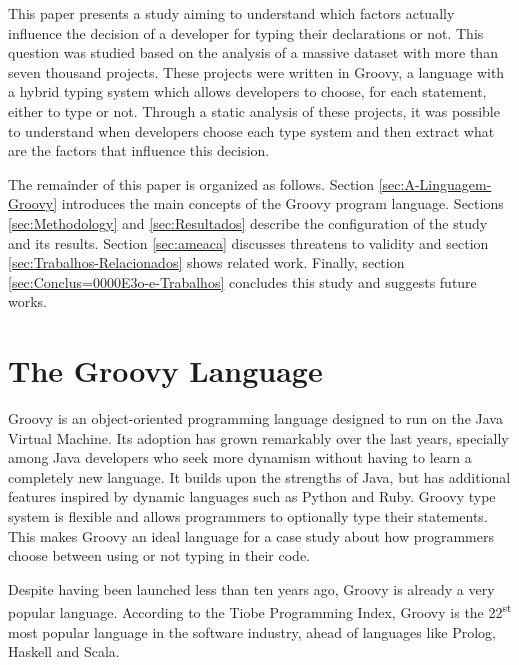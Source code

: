 \documentclass[preprint]{sigplanconf}
\begin{document}
This paper presents a study aiming to understand which factors actually influence the decision of a developer for typing their declarations or not. 
This question was studied based on the analysis of a massive dataset with more than seven thousand projects.
These projects were written in Groovy, a language with a hybrid typing system which allows developers to choose, for each statement, either to type or not.
Through a static analysis of these projects, it was possible to understand when developers choose each type system and then extract what are the factors that influence this decision.

The remainder of this paper is organized as follows. 
Section \ref{sec:A-Linguagem-Groovy} introduces the main concepts of the Groovy program language. 
Sections \ref{sec:Methodology} and \ref{sec:Resultados} describe the configuration of the study and its results. 
Section \ref{sec:ameaca} discusses threatens to validity and section \ref{sec:Trabalhos-Relacionados} shows related work. 
Finally, section  \ref{sec:Conclus=0000E3o-e-Trabalhos} concludes this study and suggests future works.















%
%

\section{The Groovy Language\label{sec:A-Linguagem-Groovy}}
Groovy is an object-oriented programming language designed to run on the Java Virtual Machine. Its adoption has grown remarkably over the last years, specially among Java developers who seek more dynamism without having to learn a completely new language.
It builds upon the strengths of Java, but has additional features inspired by dynamic languages such as Python and Ruby.
Groovy type system is flexible and allows programmers to optionally type their statements.
This makes Groovy an ideal language for a case study about how programmers choose between using or not typing in their code.

Despite having been launched less than ten years ago, Groovy is already a very popular language.
According to the Tiobe Programming Index, Groovy is the 22\textsuperscript{st} most popular language in the software industry\cite{tiobe}, ahead of languages like Prolog, Haskell and Scala. 
\end{document}

